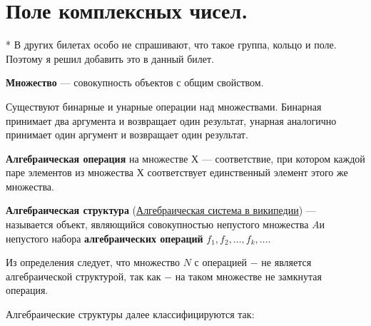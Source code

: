 \section{Поле комплексных чисел.}

* В других билетах особо не спрашивают, что такое группа, кольцо и поле. Поэтому я решил добавить это в данный билет.

{\bf Множество} --- совокупность объектов с общим свойством.

Существуют бинарные и унарные операции над множествами. Бинарная принимает два аргумента и возвращает один результат, унарная аналогично принимает один аргумент и возвращает один результат.

\down

{\bf Алгебраическая операция} на множестве $Х$ --- соответствие, при котором каждой паре элементов из множества $Х$ соответствует единственный элемент этого же множества.



{\bf Алгебраическая структура} (\href{https://ru.wikipedia.org/wiki/%D0%90%D0%BB%D0%B3%D0%B5%D0%B1%D1%80%D0%B0%D0%B8%D1%87%D0%B5%D1%81%D0%BA%D0%B0%D1%8F_%D1%81%D0%B8%D1%81%D1%82%D0%B5%D0%BC%D0%B0}{Алгебраическая система в википедии}) --- называется объект, являющийся совокупностью непустого множества $A$и непустого набора {\bf алгебраических операций} $f_1, f_2, \dots, f_k, \dots$.

 Из определения следует, что множество $N$ с операцией $-$ не является алгебраической структурой, так как $-$ на таком множестве не замкнутая операция.

\down

Алгебраические структуры далее классифицируются так:

